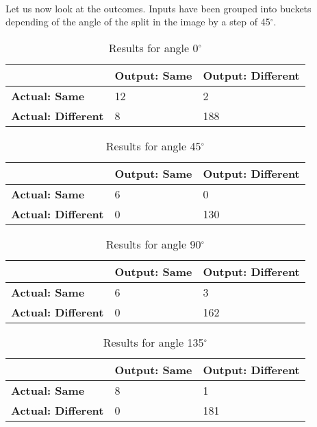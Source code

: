 \paragraph{}
Let us now look at the outcomes. Inputs have been grouped into buckets depending of the angle of the split in the image by a step of 45$^{\circ}$.

\begin{table}[H]
	\centering
    \begin{tabular}{|l|l|l|}
        \hline
        \cellcolor{gray} & \textbf{Output: Same} & \textbf{Output: Different} \\ [0.5ex]
        \hline\hline
        \textbf{Actual: Same} & 12 & 2 \\ [0.5ex]
        \hline
        \textbf{Actual: Different} & 8 & 188 \\ [0.5ex]
        \hline
    \end{tabular}
    \caption{Results for angle 0$^{\circ}$}
\end{table}
            
\begin{table}[H]
	\centering
    \begin{tabular}{|l|l|l|}
        \hline
        \cellcolor{gray} & \textbf{Output: Same} & \textbf{Output: Different} \\ [0.5ex]
        \hline\hline
        \textbf{Actual: Same} & 6 & 0 \\ [0.5ex]
        \hline
        \textbf{Actual: Different} & 0 & 130 \\ [0.5ex]
        \hline
    \end{tabular}
    \caption{Results for angle 45$^{\circ}$}
\end{table}
            
\begin{table}[H]
	\centering
    \begin{tabular}{|l|l|l|}
        \hline
        \cellcolor{gray} & \textbf{Output: Same} & \textbf{Output: Different} \\ [0.5ex]
        \hline\hline
        \textbf{Actual: Same} & 6 & 3 \\ [0.5ex]
        \hline
        \textbf{Actual: Different} & 0 & 162 \\ [0.5ex]
        \hline
    \end{tabular}
    \caption{Results for angle 90$^{\circ}$}
\end{table}
            
\begin{table}[H]
	\centering
    \begin{tabular}{|l|l|l|}
        \hline
        \cellcolor{gray} & \textbf{Output: Same} & \textbf{Output: Different} \\ [0.5ex]
        \hline\hline
        \textbf{Actual: Same} & 8 & 1 \\ [0.5ex]
        \hline
        \textbf{Actual: Different} & 0 & 181 \\ [0.5ex]
        \hline
    \end{tabular}
    \caption{Results for angle 135$^{\circ}$}
\end{table}
            
